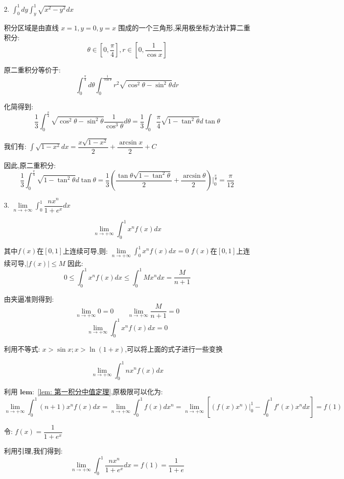 2. $\int_{0}^{1}dy\int_{y}^{1}\sqrt{x^2-y^2}dx$
\begin{solution}
	
	积分区域是由直线 $x=1,y=0,y=x$ 围成的一个三角形,采用极坐标方法计算二重积分: 
	$$\theta\in[0,\dfrac{\pi}{4}],r\in[0,\dfrac{1}{\cos x}]$$
	
	原二重积分等价于: 
	$$\int_{0}^{\frac{\pi}{4}}d\theta\int_{0}^{\frac{1}{\cos \theta}}r^2\sqrt{\cos^{2}\theta-\sin^{2}\theta}dr$$
	
	化简得到: 
	$$\frac{1}{3}\int_{0}^{\frac{\pi}{4}}\sqrt{\cos^{2}\theta-\sin^{2}\theta}\frac{1}{\cos^{3}\theta}d\theta=\frac{1}{3}\int_{0}{\frac{\pi}{4}}\sqrt{1-\tan^{2}\theta}d\tan \theta$$
	
	我们有: $\int\sqrt{1-x^2}dx=\dfrac{x\sqrt{1-x^2}}{2}+\dfrac{\arcsin x}{2}+C$
	
	因此,原二重积分: $$\dfrac{1}{3}\int_{0}^{\frac{\pi}{4}}\sqrt{1-\tan^{2}\theta}d\tan \theta=\dfrac{1}{3}(\dfrac{\tan \theta\sqrt{1-\tan^{2}\theta}}{2}+\dfrac{\arcsin \theta}{2} )|_{0}^{\frac{\pi}{4}} =\dfrac{\pi}{12}$$
\end{solution}


3. $\lim\limits_{n\rightarrow +\infty}\int_{0}^{1}\dfrac{nx^n}{1+e^x}dx$
\begin{lemma}[第一积分中值定理]\label{lem: 第一积分中值定理}
	
	$$\lim\limits_{n\rightarrow +\infty}\int_{0}^{1}x^nf(x)dx$$
	
	其中$f(x)$在$[0,1]$上连续可导,则: $\lim\limits_{n\rightarrow +\infty}\int_{0}^{1}x^nf(x)dx=0$
	$f(x)$在$[0,1]$上连续可导,$|f(x)|\leq M$
	因此: 
	$$0\leq\int_{0}^{1}x^nf(x)dx\leq\int_{0}^{1}Mx^ndx=\frac{M}{n+1}$$
	
	由夹逼准则得到: 
	$$\lim\limits_{n\rightarrow +\infty}0=0\quad\quad \lim\limits_{n\rightarrow +\infty}\frac{M}{n+1}=0$$
	$$\lim\limits_{n\rightarrow +\infty}\int_{0}^{1}x^nf(x)dx=0$$
	
	利用不等式: $x>\sin x;x>\ln(1+x)$,可以将上面的式子进行一些变换
	
\end{lemma}
\begin{lemma}
	
	$$\lim\limits_{n\rightarrow +\infty}\int_{0}^{1}nx^nf(x)dx$$
	
	利用 $\mathbf{lem: }$ \ref{lem: 第一积分中值定理},原极限可以化为: 
	$$\lim\limits_{n\rightarrow +\infty}\int_{0}^{1}(n+1)x^nf(x)dx=\lim\limits_{n\rightarrow +\infty}\int_{0}^{1}f(x)dx^n=\lim\limits_{n\rightarrow+\infty}[(f(x)x^n)|_{0}^{1}-\int_{0}^{1}f'(x)x^ndx]=f(1)$$
\end{lemma}
\begin{solution}
	
	令: $f(x)=\dfrac{1}{1+e^x}$
	
	利用引理,我们得到: $$\lim\limits_{n\rightarrow +\infty}\int_{0}^{1}\dfrac{nx^n}{1+e^x}dx=f(1)=\dfrac{1}{1+e}$$
\end{solution}

